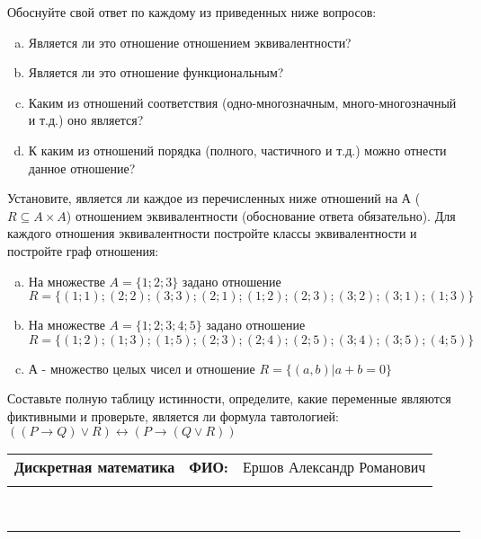 \documentclass[10pt]{exam}
\newcommand{\class}{Дискретная математика}
\newcommand{\examdate}{}
\begin{document}
\begin{questions}
Обоснуйте свой ответ по каждому из приведенных ниже вопросов:
\begin{enumerate} [a)]\setcounter{enumi}{0}
    \item Является ли это отношение отношением эквивалентности?
    \item Является ли это отношение функциональным?
    \item Каким из отношений соответствия (одно-многозначным, много-многозначный и т.д.) оно является?
    \item К каким из отношений порядка (полного, частичного и т.д.) можно отнести данное отношение?
\end{enumerate}
\question
Установите, является ли каждое из перечисленных ниже отношений на А ($R \subseteq A \times A$) отношением эквивалентности (обоснование ответа обязательно). Для каждого отношения эквивалентности постройте классы 
эквивалентности и постройте граф отношения:
\begin{enumerate} [a)]\setcounter{enumi}{0}
\item На множестве $A = \{1; 2; 3\}$ задано отношение $R = \{(1; 1); (2; 2); (3; 3); (2; 1); (1; 2); (2; 3); (3; 2); (3; 1); (1; 3)\}$
\item На множестве $A = \{1; 2; 3; 4; 5\}$ задано отношение $R = \{(1; 2); (1; 3); (1; 5); (2; 3); (2; 4); (2; 5); (3; 4); (3; 5); (4; 5)\}$
\item А - множество целых чисел и отношение $R = \{(a,b)|a + b = 0\}$
\end{enumerate}\question Составьте полную таблицу истинности, определите, какие переменные являются фиктивными и проверьте, является ли формула тавтологией:
$((P \rightarrow Q) \lor R) \leftrightarrow (P \rightarrow (Q \lor R))$

\end{questions}
\newpage
\begin{flushright}
\begin{tabular}{p{2.8in} r l}
\textbf{\class} & \textbf{ФИО:} &Ершов Александр Романович
\\

\textbf{\examdate} &&\\
\end{tabular}\\
\end{flushright}
\rule[1ex]{\textwidth}{.1pt}
\end{document}
